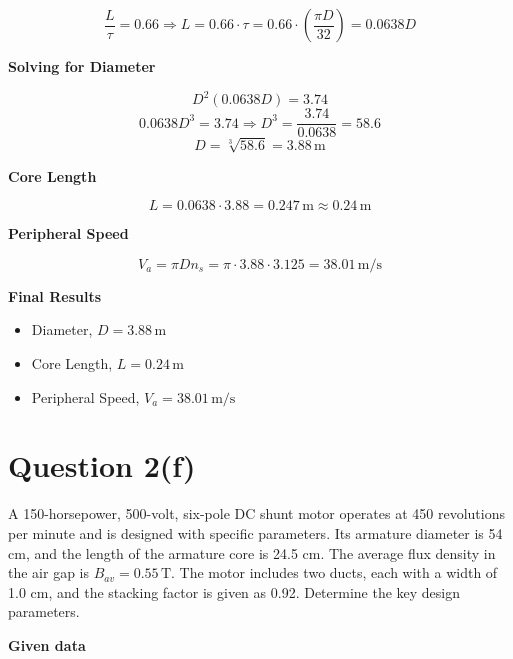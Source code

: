 \documentclass[12pt]{article}
\begin{document}
\[
\frac{L}{\tau} = 0.66 \Rightarrow L = 0.66 \cdot \tau = 0.66 \cdot \left(\frac{\pi D}{32}\right) = 0.0638 D
\]

\vspace{5pt}

\noindent
\textbf{Solving for Diameter}

\[
D^2 (0.0638 D) = 3.74
\]
\[
0.0638 D^3 = 3.74 \Rightarrow D^3 = \frac{3.74}{0.0638} = 58.6
\]
\[
D = \sqrt[3]{58.6} = 3.88\, \text{m}
\]

\vspace{5pt}

\noindent
\textbf{Core Length}

\[
L = 0.0638 \cdot 3.88 = 0.247\, \text{m} \approx 0.24\, \text{m}
\]

\vspace{5pt}

\noindent
\textbf{Peripheral Speed}

\[
V_a = \pi D n_s = \pi \cdot 3.88 \cdot 3.125 = 38.01\, \text{m/s}
\]

\vspace{10pt}

\noindent
\textbf{Final Results}

\begin{itemize}
	\item Diameter, $D = 3.88\, \text{m}$
	\item Core Length, $L = 0.24\, \text{m}$
	\item Peripheral Speed, $V_a = 38.01\, \text{m/s}$
\end{itemize}




\section*{Question 2(f)}

A 150-horsepower, 500-volt, six-pole DC shunt motor operates at 450 revolutions per minute and is designed with specific parameters. Its armature diameter is 54 cm, and the length of the armature core is 24.5 cm. The average flux density in the air gap is $B_{av} = 0.55\, \text{T}$. The motor includes two ducts, each with a width of 1.0 cm, and the stacking factor is given as 0.92. Determine the key design parameters.

\vspace{10pt}

\noindent
\textbf{Given data}

\vspace{5pt}
\end{document}
